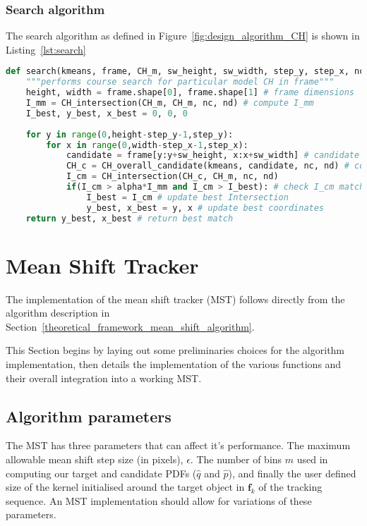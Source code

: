 \subsubsection{Search algorithm}
The search algorithm as defined in Figure~\ref{fig:design_algorithm_CH} is shown
in Listing~\ref{lst:search}
\begin{lstlisting}[language=Python, caption={CCH detection search algorithm}, captionpos=b, label={lst:search}]
def search(kmeans, frame, CH_m, sw_height, sw_width, step_y, step_x, nc, nd, alpha):
    """performs course search for particular model CH in frame"""
    height, width = frame.shape[0], frame.shape[1] # frame dimensions 
    I_mm = CH_intersection(CH_m, CH_m, nc, nd) # compute I_mm 
    I_best, y_best, x_best = 0, 0, 0
    
    for y in range(0,height-step_y-1,step_y):
        for x in range(0,width-step_x-1,step_x):
            candidate = frame[y:y+sw_height, x:x+sw_width] # candidate window 
            CH_c = CH_overall_candidate(kmeans, candidate, nc, nd) # compute candidate CH
            I_cm = CH_intersection(CH_c, CH_m, nc, nd)
            if(I_cm > alpha*I_mm and I_cm > I_best): # check I_cm match against threshold and best match
                I_best = I_cm # update best Intersection
                y_best, x_best = y, x # update best coordinates            
    return y_best, x_best # return best match
\end{lstlisting}

\section{Mean Shift Tracker}\label{implementation_mean_shift_tracker}
The implementation of the mean shift tracker (MST) follows directly from the algorithm
description in Section~\ref{theoretical_framework_mean_shift_algorithm}.

This Section begins by laying out some preliminaries choices for the algorithm
implementation, then details the implementation of the various functions and
their overall integration into a working MST\@. 

\subsection{Algorithm parameters}
The MST has three parameters that can affect it's performance.
The maximum allowable mean shift step size (in pixels), $\epsilon$. The number
of bins $m$ used in computing our target and candidate PDFs ($\hat{q}$  and
$\hat{p}$), and finally the user defined size of the kernel initialised around the target
object in $\mathbf{f}_k$ of the tracking sequence.
An MST implementation should allow for variations of these parameters.

